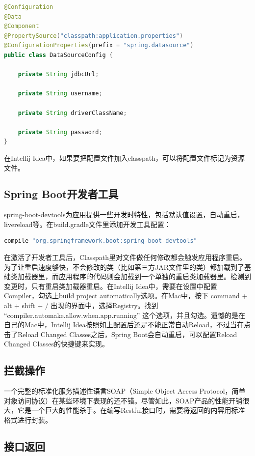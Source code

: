 \documentclass[letter]{book}
\begin{document}
\begin{lstlisting}[language=Java]
@Configuration
@Data
@Component
@PropertySource("classpath:application.properties")
@ConfigurationProperties(prefix = "spring.datasource")
public class DataSourceConfig {

	private String jdbcUrl;
	
	private String username;
	
	private String driverClassName;
	
	private String password;
}
\end{lstlisting}

在Intellij Idea中，如果要把配置文件加入classpath，可以将配置文件标记为资源文件。

\subsection{Spring Boot开发者工具}

spring-boot-devtools为应用提供一些开发时特性，包括默认值设置，自动重启，livereload等。在build.gradle文件里添加开发工具配置：

\begin{lstlisting}[language=Bash]
compile "org.springframework.boot:spring-boot-devtools"
\end{lstlisting}

在激活了开发者工具后，Classpath里对文件做任何修改都会触发应用程序重启。为了让重启速度够快，不会修改的类（比如第三方JAR文件里的类）都加载到了基础类加载器里，而应用程序的代码则会加载到一个单独的重启类加载器里。检测到变更时，只有重启类加载器重启。在Intellij Idea中，需要在设置中配置Compiler，勾选上build project automatically选项。在Mac中，按下 command + alt + shift + / 出现的界面中，选择Registry。找到 “compiler.automake.allow.when.app.running” 这个选项，并且勾选。遗憾的是在自己的Mac中，Intellij Idea按照如上配置后还是不能正常自动Reload，不过当在点击了Reload Changed Classes之后，Spring Boot会自动重启，可以配置Reload Changed Classes的快捷键来实现。

\subsection{拦截操作}

一个完整的标准化服务描述性语言SOAP（Simple Object Access Protocol，简单对象访问协议）在某些环境下表现的还不错。尽管如此，SOAP产品的性能开销很大，它是一个巨大的性能杀手。在编写Restful接口时，需要将返回的内容用标准格式进行封装。


\subsection{接口返回}
\end{document}
